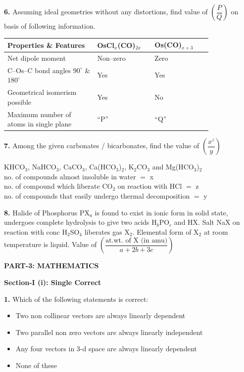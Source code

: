 \documentclass[10pt,twocolumn]{extarticle}
\renewcommand{\arraystretch}{1.15}
\newenvironment{qoptions}{\begin{itemize}[leftmargin=1.8em,itemsep=2pt,topsep=2pt,label={}]}{\end{itemize}}
\newcommand{\opt}[2]{\item[({#1})] {#2}}
\newcommand{\sectionhdr}[1]{\par\vspace{4pt}\noindent\textbf{\large #1}\par\vspace{2pt}}
\newcommand{\subsectionhdr}[1]{\par\vspace{3pt}\noindent\textbf{#1}\par\vspace{2pt}}
\begin{document}
\textbf{6.} Assuming ideal geometries without any distortions, find value of $\left(\dfrac PQ\right)$ on basis of following information.

\begin{center}
\small
\renewcommand{\arraystretch}{1.3}
\begin{tabular}{@{}p{0.36\linewidth}p{0.23\linewidth}p{0.23\linewidth}@{}}
\textbf{Properties \& Features} & \textbf{OsCl$_x$\-(CO)$_{2x}$} & \textbf{Os(CO)$_{x+3}$}\\
\midrule
Net dipole moment & Non--zero & Zero\\
C--Os--C bond angles $90^\circ$ \& $180^\circ$ & Yes & Yes\\
Geometrical isomerism possible & Yes & No\\
Maximum number of atoms in single plane & ``P'' & ``Q''\\
\end{tabular}
\normalsize
\renewcommand{\arraystretch}{1.15}
\end{center}

\textbf{7.} Among the given carbonates / bicarbonates, find the value of $\left(\dfrac{x^z}{y}\right)$

KHCO$_3$, NaHCO$_3$, CaCO$_3$, Ca(HCO$_3$)$_2$, K$_2$CO$_3$ and Mg(HCO$_3$)$_2$\\
no. of compounds almost insoluble in water $=$ x\\
no. of compound which liberate CO$_2$ on reaction with HCl $=$ z\\
no. of compounds that easily undergo thermal decomposition $=$ y

\textbf{8.} Halide of Phosphorus PX$_a$ is found to exist in ionic form in solid state, undergoes complete hydrolysis to give two acids H$_b$PO$_c$ and HX. Salt NaX on reaction with conc H$_2$SO$_4$ liberates gas X$_2$. Elemental form of X$_2$ at room temperature is liquid. Value of $\left(\dfrac{\text{at.wt. of X (in amu)}}{a+2b+3c}\right)$

\sectionhdr{PART-3: MATHEMATICS}
\subsectionhdr{Section-I (i): Single Correct}

\textbf{1.} Which of the following statements is correct:

\begin{qoptions}
\opt{A}{Two non collinear vectors are always linearly dependent}
\opt{B}{Two parallel non zero vectors are always linearly independent}
\opt{C}{Any four vectors in 3-d space are always linearly dependent}
\opt{D}{None of these}
\end{qoptions}
\end{document}
